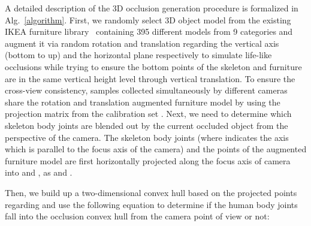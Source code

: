 \documentclass[lettersize,journal]{IEEEtran}
\begin{document}
A detailed description of the 3D occlusion generation procedure is formalized in Alg.~\ref{algorithm}. 
First, we randomly select 3D object model from the existing IKEA furniture library~\cite{sun2018pix3d} containing 395 different models from 9 categories and augment it via random rotation and translation regarding the vertical axis (bottom to up) and the horizontal plane respectively to simulate life-like occlusions while trying to ensure the bottom points of the skeleton and furniture are in the same vertical height level through vertical translation.
To ensure the cross-view consistency, samples collected simultaneously by different cameras share the rotation and translation augmented furniture model by using the projection matrix from the calibration set .
Next, we need to determine which skeleton body joints are blended out by the current occluded object from the perspective of the camera.
The skeleton body joints  (where  indicates the axis which is parallel to the focus axis of the camera) and the points of the augmented furniture model  are first horizontally projected along the focus axis of camera into  and , as  and .

Then, we build up a two-dimensional convex hull based on the projected points regarding  and use the following equation to determine if the human body joints fall into the occlusion convex hull from the camera point of view or not:
\end{document}
